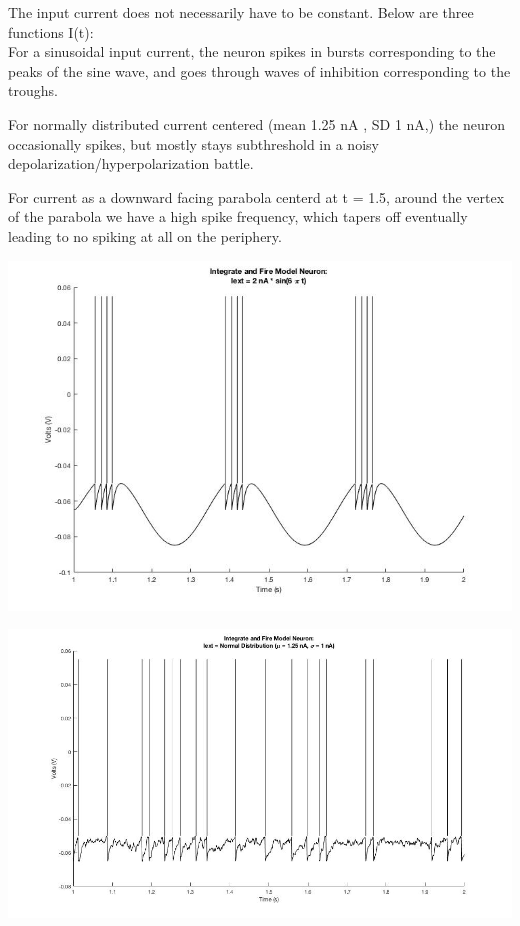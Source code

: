 \documentclass{121Temp}
\begin{document}
\hwproblem
The input current does not necessarily have to be constant. Below are three functions I(t): \\
For a sinusoidal input current, the neuron spikes in bursts corresponding to the peaks of the sine wave, and goes through waves of inhibition corresponding to the troughs.

For normally distributed current centered (mean 1.25 nA , SD 1 nA,) the neuron occasionally spikes, but mostly stays subthreshold in a noisy depolarization/hyperpolarization battle. 

For current as a downward facing parabola centerd at t = 1.5, around the vertex of the parabola we have a high spike frequency, which tapers off eventually leading to no spiking at all on the periphery.

\includegraphics[scale=.65]{sine.jpg}

\includegraphics[scale=.55]{normrnd.jpg}
\end{document}
